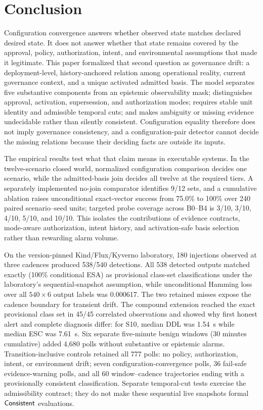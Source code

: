 \section{Conclusion}
\label{sec:conclusion}

Configuration convergence answers whether observed state matches declared
desired state. It does not answer whether that state remains covered by the
approval, policy, authorization, intent, and environmental assumptions that
made it legitimate. This paper formalized that second question as governance
drift: a deployment-level, history-anchored relation among operational
reality, current governance context, and a unique activated admitted basis.
The model separates five substantive components from an epistemic
observability mask; distinguishes approval, activation, supersession, and
authorization modes; requires stable unit identity and admissible temporal
cuts; and makes ambiguity or missing evidence undecidable rather than silently
consistent. Configuration equality therefore does not imply governance
consistency, and a configuration-pair detector cannot decide the missing
relations because their deciding facts are outside its inputs.

The empirical results test what that claim means in executable systems. In the
twelve-scenario closed world, normalized configuration comparison decides one
scenario, while the admitted-basis join decides all twelve at the required
tiers. A separately implemented no-join comparator identifies 9/12 sets, and
a cumulative ablation raises unconditional exact-vector success from 75.0\%
to 100\% over 240 paired scenario--seed units; targeted probe coverage across
B0--B4 is 3/10, 3/10, 4/10, 5/10, and 10/10. This isolates the contributions
of evidence contracts, mode-aware authorization, intent history, and
activation-safe basis selection rather than rewarding alarm volume.

On the version-pinned Kind/Flux/Kyverno laboratory, 180 injections observed at three
cadences produced 538/540 detections. All 538 detected outputs matched exactly
(100\% conditional ESA) as provisional class-set classifications under the
laboratory's sequential-snapshot assumption, while unconditional Hamming loss over all
$540\times6$ output labels was 0.000617. The two retained misses expose the
cadence boundary for transient drift. The compound extension reached the
exact provisional class set in 45/45 correlated observations and showed why first
honest alert and complete diagnosis differ: for S10, median DDL was 1.54~s
while median ESC was 7.61~s. Six separate five-minute benign windows
(30 minutes cumulative) added 4,680 polls without substantive or epistemic
alarms. Transition-inclusive controls retained all 777 polls: no policy,
authorization, intent, or environment drift; seven configuration-convergence polls, 36 fail-safe
evidence-warning polls, and all 60 window--cadence trajectories ending
with a provisionally consistent classification. Separate temporal-cut tests
exercise the admissibility contract; they do not make these sequential live
snapshots formal $\mathsf{Consistent}$ evaluations.

